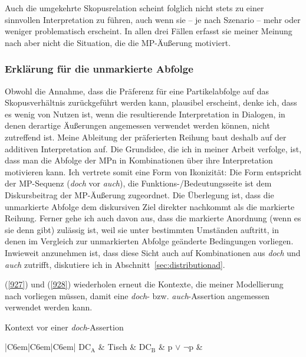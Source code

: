 {Auch die umgekehrte Skopusrelation scheint folglich nicht stets zu einer sinn\-vollen Interpretation zu führen, auch wenn sie – je nach Szenario – mehr oder weniger problematisch erscheint. In allen drei Fällen erfasst sie meiner Meinung nach aber nicht die Situation, die die MP-Äußerung motiviert.

\subsubsection{Erklärung für die unmarkierte Abfolge}
Obwohl die Annahme, dass die Präferenz für eine Partikelabfolge auf das Skopusverhältnis zurückgeführt werden kann, plausibel erscheint, denke ich, dass es wenig von Nutzen ist, wenn die resultierende Interpretation in Dialogen, in denen derartige Äußerungen angemessen verwendet werden können, nicht zu\-treffend ist. Meine Ableitung der präferierten Reihung baut deshalb auf der additiven Interpretation auf. Die Grundidee, die ich in meiner Arbeit verfolge, ist, dass man die Abfolge der MPn in Kombinationen über ihre Interpretation motivieren kann. Ich vertrete somit eine Form von Ikonizität: Die Form entspricht der MP-Sequenz (\textit{doch} vor \textit{auch}), die Funktions-/Bedeutungsseite ist dem Diskursbeitrag der MP-Äußerung zugeordnet. Die Überlegung ist, dass die unmarkierte Abfolge dem diskursiven Ziel direkter nachkommt als die markierte Reihung. Ferner gehe ich auch davon aus, dass die markierte Anordnung (wenn es sie denn gibt) zulässig ist, weil sie unter bestimmten Umständen auftritt, in denen im Vergleich zur unmarkierten Abfolge geänderte Bedingungen vorliegen. Inwieweit anzunehmen ist, dass diese Sicht auch auf Kombinationen aus \textit{doch} und \textit{auch} zutrifft, diskutiere ich in Abschnitt~\ref{sec:distributionad}.

(\ref{927}) und (\ref{928}) wiederholen erneut die Kontexte, die meiner Modellierung nach vorliegen müssen, damit eine \textit{doch}- bzw. \textit{auch}-Assertion angemessen verwendet werden kann.

\begin{exe}
	\ex\label{927} Kontext vor einer \textit{doch}-Assertion\\[-1em]
 	\begin{tabular}[t]{|C{6em}|C{6em}|C{6em}|}
 	\hline 	
 	$\textrm{DC}_{\textrm{A}}$ & {Tisch} & $\textrm{DC}_{\textrm{B}}$ \tabularnewline
  	\hline
    & p $\vee$ $\neg$p & \tabularnewline
 	\hline      
   	 \tabularnewline   
   	\hline
 	\end{tabular}
\end{exe}

}
